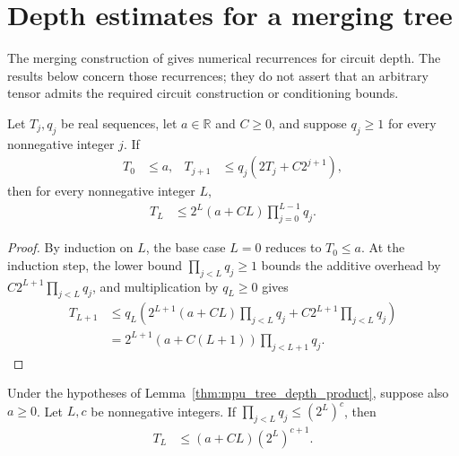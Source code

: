 \section{Depth estimates for a merging tree}

The merging construction of \cite{Styliaris2025MPUCircuits} gives numerical
recurrences for circuit depth. The results below concern those recurrences;
they do not assert that an arbitrary tensor admits the required circuit
construction or conditioning bounds.

\begin{lemma}
    \label{thm:mpu_tree_depth_product}
    \leanok
    Let $T_j,q_j$ be real sequences, let $a\in\mathbb R$ and $C\geq0$, and
    suppose $q_j\geq1$ for every nonnegative integer $j$. If
    \begin{align}
        T_0     & \leq a,                  &
        T_{j+1} & \leq q_j(2T_j+C2^{j+1}),
    \end{align}
    then for every nonnegative integer $L$,
    \begin{align}
        T_L & \leq 2^L(a+CL)\prod_{j=0}^{L-1}q_j.
    \end{align}
\end{lemma}

\begin{proof}\leanok
    By induction on $L$, the base case $L=0$ reduces to $T_0\leq a$. At
    the induction step, the lower bound $\prod_{j<L}q_j\geq1$ bounds the
    additive overhead by $C2^{L+1}\prod_{j<L}q_j$, and multiplication by
    $q_L\geq0$ gives
    \begin{align}
        T_{L+1}
         & \leq q_L\left(2^{L+1}(a+CL)\prod_{j<L}q_j
        +C2^{L+1}\prod_{j<L}q_j\right)               \\
         & =2^{L+1}(a+C(L+1))\prod_{j<L+1}q_j.
    \end{align}
\end{proof}

\begin{lemma}
    \label{thm:mpu_tree_depth_polynomial}
    \leanok
    Under the hypotheses of Lemma~\ref{thm:mpu_tree_depth_product}, suppose
    also $a\geq0$. Let $L,c$ be nonnegative integers. If
    $\prod_{j<L}q_j\leq (2^L)^c$, then
    \begin{align}
        T_L & \leq (a+CL)(2^L)^{c+1}.
    \end{align}
\end{lemma}

